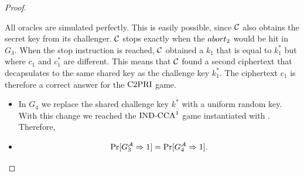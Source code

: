 \documentclass{article}
\begin{document}
\begin{proof}
\begin{itemize}
                                                                                                            All oracles are simulated perfectly.
                                                                                                            This is easily possible, since $\mathcal{C}$ also obtains the secret key from its challenger.
                                                                                                            $\mathcal{C}$ stops exactly when the $abort_2$ would be hit in $G_3$.
                                                                                                            When the stop instruction is reached, $\mathcal{C}$ obtained a $k_1$ that is equal to $k^*_1$ but where $c_1$ and $c^*_1$ are different.
                                                                                                            This means that $\mathcal{C}$ found a second ciphertext that decapsulates to the same shared key as the challenge key $k^*_1$.
                                                                                                            The ciphertext $c_1$ is therefore a correct answer for the $\text{C2PRI}$ game.
                                                                                                        \end{itemize}

                                                                                                        \begin{itemize}
                                                                                                        \item[\textbf{Game 4}]
                                                                                                            In $G_4$ we replace the shared challenge key $k^*$ with a uniform random key.
                                                                                                            With this change we reached the $\text{IND-CCA}^1$ game instantiated with \hqb.
                                                                                                            Therefore,

                                                                                                        \item[\emph{Claim 4}]

                                                                                                            \[ \Pr[G^{\mathcal{A}}_3 \Rightarrow 1] = \Pr[G^{\mathcal{A}}_4 \Rightarrow 1]. \]


\end{itemize}
\end{proof}
\end{document}
